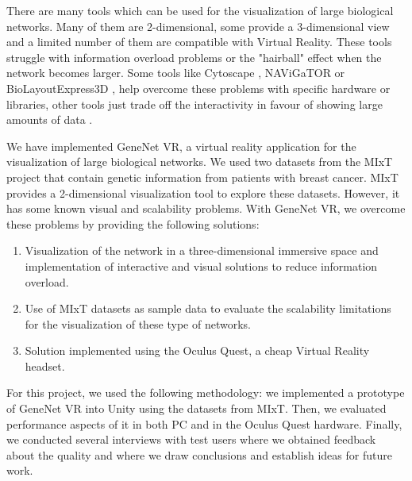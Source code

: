 
There are many tools which can be used for the visualization of large biological networks. Many of them are 2-dimensional, some provide a 3-dimensional view and a limited number of them are compatible with Virtual Reality. These tools struggle with information overload problems or the "hairball" effect when the network becomes larger. Some tools like Cytoscape \cite{cytoscape}, NAViGaTOR \cite{navigator} or BioLayoutExpress3D \cite{biolayout3d}, help overcome these problems with specific hardware or libraries, other tools just trade off the interactivity in favour of showing large amounts of data \cite{agapito_guzzi_cannataro_2013}.




We have implemented GeneNet VR, a virtual reality application for the visualization of large biological networks. We used two datasets from the MIxT project \cite{dumeaux_fjukstad_interactions_tumor_blood} that contain genetic information from patients with breast cancer. MIxT provides a 2-dimensional visualization tool to explore these datasets. However, it has some known visual and scalability problems. With GeneNet VR, we overcome these problems by providing the following solutions:
\begin{enumerate}
  \item Visualization of the network in a three-dimensional immersive space and implementation of interactive and visual solutions to reduce information overload.
  \item Use of MIxT datasets as sample data to evaluate the scalability limitations for the visualization of these type of networks.
  \item Solution implemented using the Oculus Quest, a cheap Virtual Reality headset.
\end{enumerate}

For this project, we used the following methodology: we implemented a prototype of GeneNet VR into Unity using the datasets from MIxT. Then, we evaluated performance aspects of it in both PC and in the Oculus Quest hardware. Finally, we conducted several interviews with test users where we obtained feedback about the quality and where we draw conclusions and establish ideas for future work.

